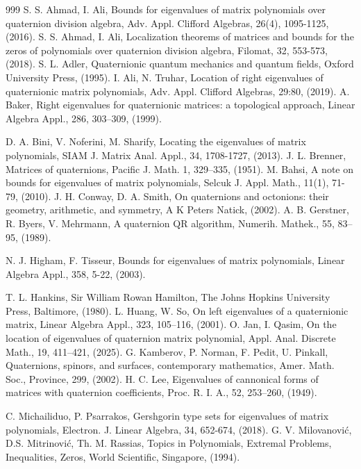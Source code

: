 \documentclass [12pt]{article}
\begin{document}
\begin{thebibliography}{999}
  S. S. Ahmad, I. Ali, Bounds for eigenvalues of matrix polynomials over quaternion division algebra, Adv. Appl. Clifford Algebras, 26(4), 1095-1125, (2016).
		  S. S. Ahmad, I. Ali, Localization theorems of matrices and bounds for the zeros of polynomials over quaternion division algebra, Filomat, 32, 553-573, (2018).
   S. L. Adler, Quaternionic quantum mechanics and quantum fields, Oxford University Press, (1995).
    I. Ali, N. Truhar, Location of right eigenvalues of quaternionic matrix polynomials, Adv. Appl. Clifford Algebras, 29:80, (2019). 
    A. Baker, Right eigenvalues for quaternionic matrices: a topological approach, Linear Algebra Appl., 286, 303–309, (1999).

    D. A. Bini, V. Noferini, M. Sharify, Locating the eigenvalues of matrix polynomials, SIAM J. Matrix Anal. Appl., 34, 1708-1727, (2013).
    J. L.  Brenner, Matrices of quaternions, Pacific J. Math. 1, 329–335, (1951).
		  M. Bahsi, A note on bounds for eigenvalues of matrix polynomials, Selcuk J. Appl. Math., 11(1), 71-79, (2010).
		         J. H.  Conway, D. A. Smith, On quaternions and octonions: their geometry, arithmetic, and symmetry, A K Peters Natick, (2002).
 A. B. Gerstner, R. Byers, V. Mehrmann, A quaternion QR algorithm, Numerih. Mathek., 55, 83–95, (1989).


		 N. J. Higham, F. Tisseur, Bounds for eigenvalues of matrix polynomials, Linear Algebra Appl., 358, 5-22, (2003).
  
   T. L. Hankins, Sir William Rowan Hamilton, The Johns Hopkins University Press, Baltimore, (1980).
 L. Huang, W. So, On left eigenvalues of a quaternionic matrix, Linear Algebra Appl., 323, 105–116, (2001).
   O. Jan, I. Qasim, On the location of eigenvalues of quaternion matrix polynomial, Appl. Anal. Discrete Math.,  19, 411–421, (2025).
    G. Kamberov,  P. Norman, F. Pedit, U. Pinkall, Quaternions, spinors, and surfaces, contemporary mathematics, Amer. Math. Soc., Province, 299, (2002).
   H. C. Lee, Eigenvalues of cannonical forms of matrices with quaternion coefficients, Proc. R. I. A., 52, 253–260, (1949).
  
		  C. Michailiduo, P. Psarrakos, Gershgorin type sets for eigenvalues of matrix polynomials, Electron. J. Linear Algebra, 34, 652-674, (2018).
          G. V. Milovanovi\'c, D.S. Mitrinovi\'c, Th. M. Rassias, Topics in Polynomials, Extremal Problems, Inequalities, Zeros, World Scientific, Singapore, (1994).


\end{thebibliography}
\end{document}
